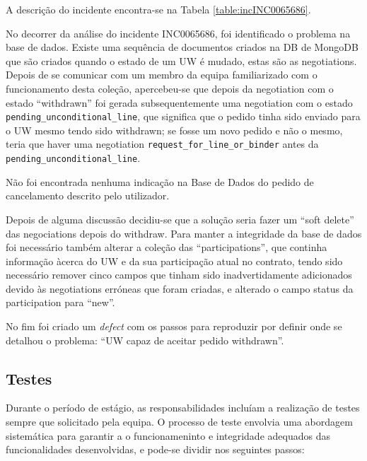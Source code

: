             A descrição do incidente encontra-se na Tabela \ref{table:incINC0065686}.

            No decorrer da análise do incidente INC0065686, foi identificado o problema na base de dados. Existe uma sequência de documentos criados na DB de MongoDB que são criados quando o estado de um UW é mudado, estas são as negotiations. Depois de se comunicar com um membro da equipa familiarizado com o funcionamento desta coleção, apercebeu-se que depois da negotiation com o estado ``withdrawn'' foi gerada subsequentemente uma negotiation com o estado \texttt{pending\_unconditional\_line}, que significa que o pedido tinha sido enviado para o UW mesmo tendo sido withdrawn; se fosse um novo pedido e não o mesmo, teria que haver uma negotiation \texttt{request\_for\_line\_or\_binder} antes da \texttt{pending\_unconditional\_line}.

            Não foi encontrada nenhuma indicação na Base de Dados do pedido de cancelamento descrito pelo utilizador.

            Depois de alguma discussão decidiu-se que a solução seria fazer um ``soft delete'' das negociations depois do withdraw. Para manter a integridade da base de dados foi necessário também alterar a coleção das ``participations'', que continha informação àcerca do UW e da sua participação atual no contrato, tendo sido necessário remover cinco campos que tinham sido inadvertidamente adicionados devido às negotiations erróneas que foram criadas, e alterado o campo status da participation para ``new''.
            
            No fim foi criado um \textit{defect} com os passos para reproduzir por definir onde se detalhou o problema: ``UW capaz de aceitar pedido withdrawn''.



    \subsection{Testes}\label{sub:tests}

        Durante o período de estágio, as responsabilidades incluíam a realização de testes sempre que solicitado pela equipa. O processo de teste envolvia uma abordagem sistemática para garantir a o funcionameninto e integridade adequados das funcionalidades desenvolvidas, e pode-se dividir nos seguintes passos:
        
